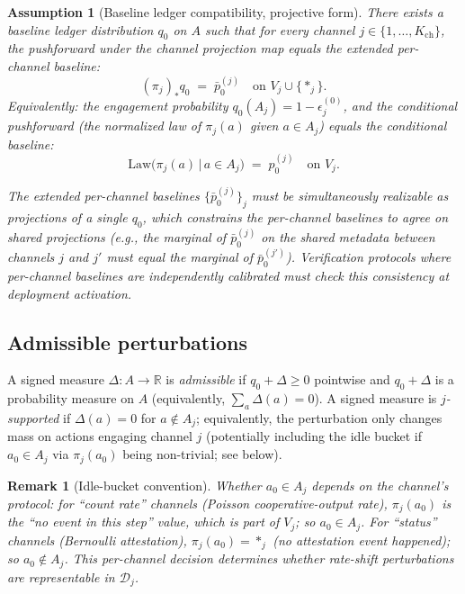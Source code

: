 \documentclass{article}
\newtheorem{remark}{Remark}
\newtheorem{assumption}{Assumption}
\newcommand{\Kch}{K_{\mathrm{ch}}}
\begin{document}
\begin{assumption}[Baseline ledger compatibility, projective form]
\label{ass:baseline-compat-v3}
There exists a baseline ledger distribution $q_0$ on $A$ such that
for every channel $j \in \{1, \ldots, \Kch\}$, the pushforward
under the channel projection map equals the extended per-channel
baseline:
\begin{equation}
\label{eq:projective-baseline}
  (\pi_j)_* q_0 \;=\; \bar{p}_0^{(j)} \quad\text{on } V_j \cup \{*_j\}.
\end{equation}
Equivalently: the engagement probability $q_0(A_j) = 1 -
\epsilon_j^{(0)}$, and the conditional pushforward (the normalized
law of $\pi_j(a)$ given $a \in A_j$) equals the conditional
baseline:
\[
  \mathrm{Law}\bigl(\pi_j(a) \,\big|\, a \in A_j\bigr) \;=\;
  p_0^{(j)} \quad\text{on } V_j.
\]

The extended per-channel baselines $\{\bar{p}_0^{(j)}\}_j$ must be
\emph{simultaneously realizable} as projections of a single $q_0$,
which constrains the per-channel baselines to agree on shared
projections (e.g., the marginal of $\bar{p}_0^{(j)}$ on the
shared metadata between channels $j$ and $j'$ must equal the
marginal of $\bar{p}_0^{(j')}$).  Verification protocols where
per-channel baselines are independently calibrated must check this
consistency at deployment activation.
\end{assumption}

\subsection{Admissible perturbations}

A signed measure $\Delta: A \to \mathbb{R}$ is \emph{admissible} if
$q_0 + \Delta \geq 0$ pointwise and $q_0 + \Delta$ is a probability
measure on $A$ (equivalently, $\sum_a \Delta(a) = 0$).  A signed
measure is \emph{$j$-supported} if $\Delta(a) = 0$ for $a \notin
A_j$; equivalently, the perturbation only changes mass on actions
engaging channel $j$ (potentially including the idle bucket if
$a_0 \in A_j$ via $\pi_j(a_0)$ being non-trivial; see below).

\begin{remark}[Idle-bucket convention]
\label{rem:idle}
Whether $a_0 \in A_j$ depends on the channel's protocol: for
``count rate'' channels (Poisson cooperative-output rate),
$\pi_j(a_0)$ is the ``no event in this step'' value, which is part
of $V_j$; so $a_0 \in A_j$.  For ``status'' channels (Bernoulli
attestation), $\pi_j(a_0) = *_j$ (no attestation event happened);
so $a_0 \notin A_j$.  This per-channel decision determines whether
rate-shift perturbations are representable in $\mathcal{D}_j$.
\end{remark}
\end{document}
